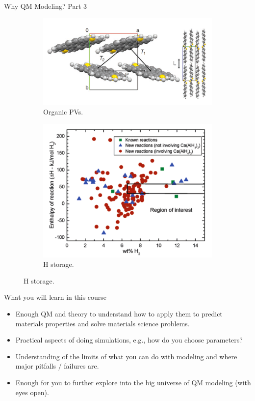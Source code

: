\documentclass[aspectratio=169]{beamer}
\begin{document}
\begin{frame}{Why QM Modeling? Part 3}
\begin{figure}
        \begin{subfigure}{0.23\linewidth}
    \includegraphics[width=\linewidth]{lectures/figures/0.5_Organic_PVs.png}
    \caption{Organic PVs\cite{sokolovComputationalDiscoveryExperimental2011}.}
    \end{subfigure}
        \begin{subfigure}{0.23\linewidth}
    \includegraphics[width=\linewidth]{lectures/figures/0.5_H_storage.png}
    \caption{H storage\cite{alapatiLargeScaleScreeningMetal2008}.}
    \end{subfigure}
\end{figure}
\end{frame}


\begin{frame}{What you will learn in this course}
\begin{itemize}
    \item Enough QM and theory to understand how to apply them to predict materials properties and solve materials science problems.
    \item Practical aspects of doing simulations, e.g., how do you choose parameters?
    \item Understanding of the limits of what you can do with modeling and where major pitfalls / failures are.
    \item Enough for you to further explore into the big universe of QM modeling (with eyes open).
\end{itemize}
    
\end{frame}
\end{document}
